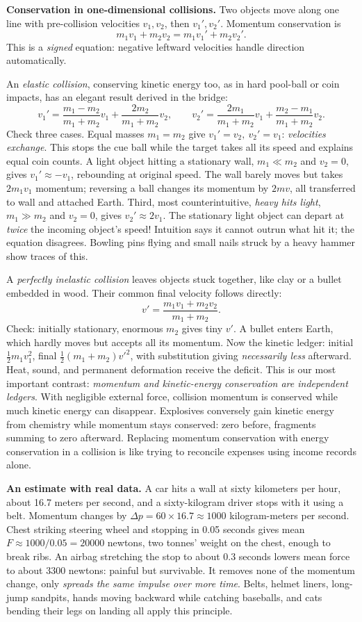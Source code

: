 \textbf{Conservation in one-dimensional collisions.} Two objects move along one line with pre-collision velocities \(v_1,v_2\), then \(v_1',v_2'\). Momentum conservation is
\[
m_1v_1+m_2v_2=m_1v_1'+m_2v_2' .
\]
This is a \emph{signed} equation: negative leftward velocities handle direction automatically.

An \emph{elastic collision}, conserving kinetic energy too, as in hard pool-ball or coin impacts, has an elegant result derived in the bridge:
\[
v_1'=\frac{m_1-m_2}{m_1+m_2}v_1+\frac{2m_2}{m_1+m_2}v_2,\qquad
v_2'=\frac{2m_1}{m_1+m_2}v_1+\frac{m_2-m_1}{m_1+m_2}v_2 .
\]
Check three cases. Equal masses \(m_1=m_2\) give \(v_1'=v_2,\ v_2'=v_1\): \emph{velocities exchange}. This stops the cue ball while the target takes all its speed and explains equal coin counts. A light object hitting a stationary wall, \(m_1\ll m_2\) and \(v_2=0\), gives \(v_1'\approx -v_1\), rebounding at original speed. The wall barely moves but takes \(2m_1v_1\) momentum; reversing a ball changes its momentum by \(2mv\), all transferred to wall and attached Earth. Third, most counterintuitive, \emph{heavy hits light}, \(m_1\gg m_2\) and \(v_2=0\), gives \(v_2'\approx 2v_1\). The stationary light object can depart at \emph{twice} the incoming object's speed! Intuition says it cannot outrun what hit it; the equation disagrees. Bowling pins flying and small nails struck by a heavy hammer show traces of this.

A \emph{perfectly inelastic collision} leaves objects stuck together, like clay or a bullet embedded in wood. Their common final velocity follows directly:
\[
v'=\frac{m_1v_1+m_2v_2}{m_1+m_2}.
\]
Check: initially stationary, enormous \(m_2\) gives tiny \(v'\). A bullet enters Earth, which hardly moves but accepts all its momentum. Now the kinetic ledger: initial \(\tfrac12 m_1v_1^2\), final \(\tfrac12(m_1+m_2)v'^2\), with substitution giving \emph{necessarily less} afterward. Heat, sound, and permanent deformation receive the deficit. This is our most important contrast: \emph{momentum and kinetic-energy conservation are independent ledgers}. With negligible external force, collision momentum is conserved while much kinetic energy can disappear. Explosives conversely gain kinetic energy from chemistry while momentum stays conserved: zero before, fragments summing to zero afterward. Replacing momentum conservation with energy conservation in a collision is like trying to reconcile expenses using income records alone.

\textbf{An estimate with real data.} A car hits a wall at sixty kilometers per hour, about 16.7 meters per second, and a sixty-kilogram driver stops with it using a belt. Momentum changes by \(\Delta p=60\times16.7\approx1000\) kilogram-meters per second. Chest striking steering wheel and stopping in 0.05 seconds gives mean \(F\approx1000/0.05=20000\) newtons, two tonnes' weight on the chest, enough to break ribs. An airbag stretching the stop to about 0.3 seconds lowers mean force to about 3300 newtons: painful but survivable. It removes none of the momentum change, only \emph{spreads the same impulse over more time}. Belts, helmet liners, long-jump sandpits, hands moving backward while catching baseballs, and cats bending their legs on landing all apply this principle.

